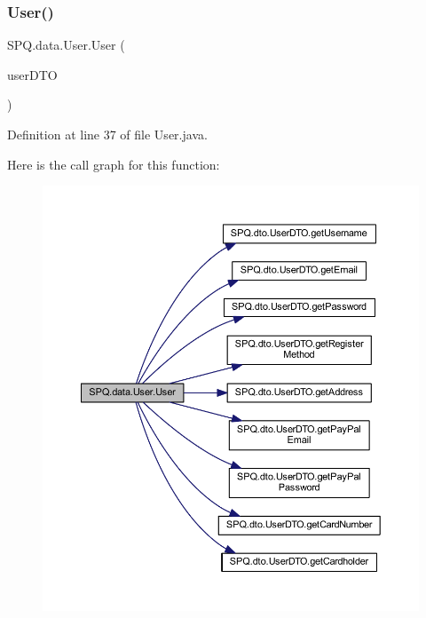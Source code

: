 \subsubsection{\texorpdfstring{User()}{User()}\hspace{0.1cm}{\footnotesize\ttfamily [4/5]}}
{\footnotesize\ttfamily S\+P\+Q.\+data.\+User.\+User (\begin{DoxyParamCaption}\item[{\mbox{\hyperlink{class_s_p_q_1_1dto_1_1_user_d_t_o}{User\+D\+TO}}}]{user\+D\+TO }\end{DoxyParamCaption})}



Definition at line 37 of file User.\+java.

Here is the call graph for this function\+:
\nopagebreak
\begin{figure}[H]
\begin{center}
\leavevmode
\includegraphics[width=350pt]{class_s_p_q_1_1data_1_1_user_af8e381901a649027950a0b0f8b22a235_cgraph}
\end{center}
\end{figure}
\mbox{\label{class_s_p_q_1_1data_1_1_user_aa21a25c33b963c3af6fb07331f4cd400}} 
